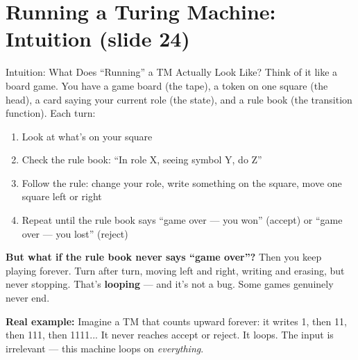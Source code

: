 \documentclass[11pt,a4paper]{article}
\begin{document}
\newpage
\section{Running a Turing Machine: Intuition (slide 24)}

\begin{conceptbox}{Intuition: What Does ``Running'' a TM Actually Look Like?}
Think of it like a board game. You have a game board (the tape), a token on one square (the head), a card saying your current role (the state), and a rule book (the transition function). Each turn:
\begin{enumerate}[nosep]
\item Look at what's on your square
\item Check the rule book: ``In role X, seeing symbol Y, do Z''
\item Follow the rule: change your role, write something on the square, move one square left or right
\item Repeat until the rule book says ``game over --- you won'' (accept) or ``game over --- you lost'' (reject)
\end{enumerate}

\textbf{But what if the rule book never says ``game over''?} Then you keep playing forever. Turn after turn, moving left and right, writing and erasing, but never stopping. That's \textbf{looping} --- and it's not a bug. Some games genuinely never end.

\textbf{Real example:} Imagine a TM that counts upward forever: it writes 1, then 11, then 111, then 1111... It never reaches accept or reject. It loops. The input is irrelevant --- this machine loops on \textit{everything}.
\end{conceptbox}
\end{document}
